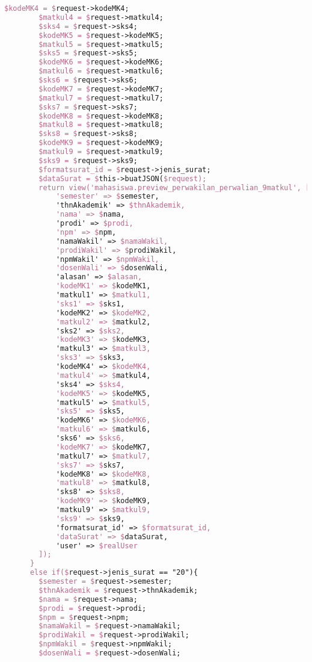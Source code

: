 \begin{lstlisting}[language=tex,basicstyle=\tiny,caption=PesanansuratController.php]
        $kodeMK4 = $request->kodeMK4;
        $matkul4 = $request->matkul4;
        $sks4 = $request->sks4;
        $kodeMK5 = $request->kodeMK5;
        $matkul5 = $request->matkul5;
        $sks5 = $request->sks5;
        $kodeMK6 = $request->kodeMK6;
        $matkul6 = $request->matkul6;
        $sks6 = $request->sks6;
        $kodeMK7 = $request->kodeMK7;
        $matkul7 = $request->matkul7;
        $sks7 = $request->sks7;
        $kodeMK8 = $request->kodeMK8;
        $matkul8 = $request->matkul8;
        $sks8 = $request->sks8;
        $kodeMK9 = $request->kodeMK9;
        $matkul9 = $request->matkul9;
        $sks9 = $request->sks9;
        $formatsurat_id = $request->jenis_surat;
        $dataSurat = $this->buatJSON($request);
        return view('mahasiswa.preview_perwakilan_perwalian_9matkul', [
            'semester' => $semester,
            'thnAkademik' => $thnAkademik,
            'nama' => $nama,
            'prodi' => $prodi,
            'npm' => $npm,
            'namaWakil' => $namaWakil,
            'prodiWakil' => $prodiWakil,
            'npmWakil' => $npmWakil,
            'dosenWali' => $dosenWali,
            'alasan' => $alasan,
            'kodeMK1' => $kodeMK1,
            'matkul1' => $matkul1,
            'sks1' => $sks1,
            'kodeMK2' => $kodeMK2,
            'matkul2' => $matkul2,
            'sks2' => $sks2,
            'kodeMK3' => $kodeMK3,
            'matkul3' => $matkul3,
            'sks3' => $sks3,
            'kodeMK4' => $kodeMK4,
            'matkul4' => $matkul4,
            'sks4' => $sks4,
            'kodeMK5' => $kodeMK5,
            'matkul5' => $matkul5,
            'sks5' => $sks5,
            'kodeMK6' => $kodeMK6,
            'matkul6' => $matkul6,
            'sks6' => $sks6,
            'kodeMK7' => $kodeMK7,
            'matkul7' => $matkul7,
            'sks7' => $sks7,
            'kodeMK8' => $kodeMK8,
            'matkul8' => $matkul8,
            'sks8' => $sks8,
            'kodeMK9' => $kodeMK9,
            'matkul9' => $matkul9,
            'sks9' => $sks9,
            'formatsurat_id' => $formatsurat_id,
            'dataSurat' => $dataSurat,
            'user' => $realUser
        ]);
      }
      else if($request->jenis_surat == "20"){
        $semester = $request->semester;
        $thnAkademik = $request->thnAkademik;
        $nama = $request->nama;
        $prodi = $request->prodi;
        $npm = $request->npm;
        $namaWakil = $request->namaWakil;
        $prodiWakil = $request->prodiWakil;
        $npmWakil = $request->npmWakil;
        $dosenWali = $request->dosenWali;

\end{lstlisting}
